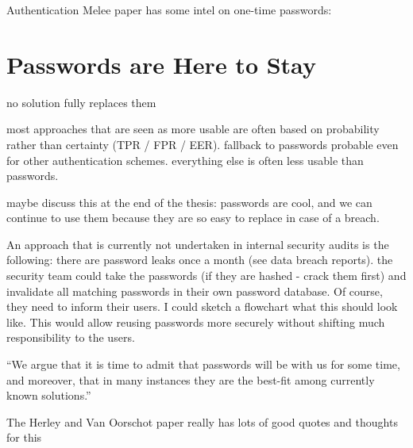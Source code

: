 Authentication Melee paper has some intel on one-time passwords: \cite{Ruoti2015AuthenticationMelee}


\section{Passwords are Here to Stay}
no solution fully replaces them

most approaches that are seen as more usable are often based on probability rather than certainty (TPR / FPR / EER). fallback to passwords probable even for other authentication schemes. everything else is often less usable than passwords. 

maybe discuss this at the end of the thesis: passwords are cool, and we can continue to use them because they are so easy to replace in case of a breach. 

An approach that is currently not undertaken in internal security audits is the following: there are password leaks once a month (see data breach reports). the security team could take the passwords (if they are hashed - crack them first) and invalidate all matching passwords in their own password database. Of course, they need to inform their users. I could sketch a flowchart what this should look like. This would allow reusing passwords more securely without shifting much responsibility to the users. 

``We argue that it is time to admit that passwords will be with us for some time, and moreover, that in many instances they are the best-fit among currently known solutions.'' \cite{Herley2012PersistenceOfPasswords} 

The Herley and Van Oorschot paper really has lots of good quotes and thoughts for this \cite{Herley2012PersistenceOfPasswords}


\cite{Kirlappos2012SecurityEducation,Loutfi2015PasswordsOtherSideOfTheFence,DeAngeli2005PictureThousandWords,Florencio2013WhereDoAllTheAttacksGo,Herley2008ProfitlessEndeavor,Sasse2015,Dittrich2009,Herley2009SoLongThanksExternalities,Vantaggiato2015WeStillNeedPasswords,Florencio2010WhereDoPoliciesComeFrom,Schrittwieser2013,Bonneau2015ImperfectAuthentication,Cyber2014,Florencio2007DoStrongWebPasswords,Sasse2005UsableSecurityPosition,Aebischer2017PicoInTheWild,Forget2007HelpingUsers,Herley2009IfWereSoSmart,Acar2016NotYourDeveloper,Sasse2016,Renaud2009VisualSnakeOil}

